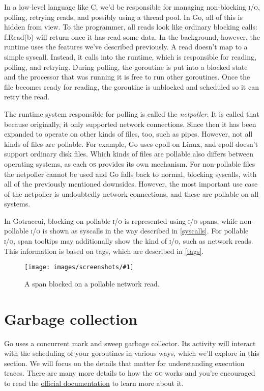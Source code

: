 \documentclass[10pt,letterpaper,oneside,openany,english]{memoir}
\newcommand{\code}[1]{{\ttfamily\mbox{#1}}}
\newcommand{\screenshot}[2]{%
\begin{figure}[!ht]
  \centering
  \texttt{[image: images/screenshots/\#1]}
  \caption{#2}
\end{figure}}
\begin{document}
In a low-level language like C, we'd be responsible for managing non-blocking \textsc{i/o}, polling, retrying reads, and possibly using a thread pool.
In Go, all of this is hidden from view. To the programmer, all reads look like ordinary blocking calls: \code{f.Read(b)} will return once it has read some data.
In the background, however, the runtime uses the features we've described previously.
A read doesn't map to a simple syscall. Instead, it calls into the runtime, which is responsible for reading, polling, and retrying.
During polling, the goroutine is put into a blocked state and the processor that was running it is free to run other goroutines.
Once the file becomes ready for reading, the goroutine is unblocked and scheduled so it can retry the read.

The runtime system responsible for polling is called the \emph{netpoller}. It is called that because originally, it only supported network connections.
Since then it has been expanded to operate on other kinds of files, too, such as pipes.
However, not all kinds of files are pollable. For example, Go uses epoll on Linux, and epoll doesn't support ordinary disk files.
Which kinds of files are pollable also differs between operating systems, as each \textsc{os} provides its own mechanism.
For non-pollable files the netpoller cannot be used and Go falls back to normal, blocking syscalls, with all of the previously mentioned downsides.
However, the most important use case of the netpoller is undoubtedly network connections, and these are pollable on all systems.

In Gotraceui, blocking on pollable \textsc{i/o} is represented using \textsc{i/o} spans, while non-pollable \textsc{i/o} is shown as syscalls in the way described in \cref{syscalls}.
For pollable \textsc{i/o}, span tooltips may additionally show the kind of \textsc{i/o}, such as network reads. This information is based on tags, which are described in \cref{tags}.

\screenshot{pollable-io-span.png}{A span blocked on a pollable network read.}

\section{Garbage collection}\label{gc}
Go uses a concurrent mark and sweep garbage collector.
Its activity will interact with the scheduling of your goroutines in various ways,
which we'll explore in this section.
We will focus on the details that matter for understanding execution traces.
There are many more details to how the \textsc{gc} works
and you're encouraged to read the \href{https://go.dev/doc/gc-guide}{official documentation}\cite{GuideGoGarbage} to learn more about it.
\end{document}

